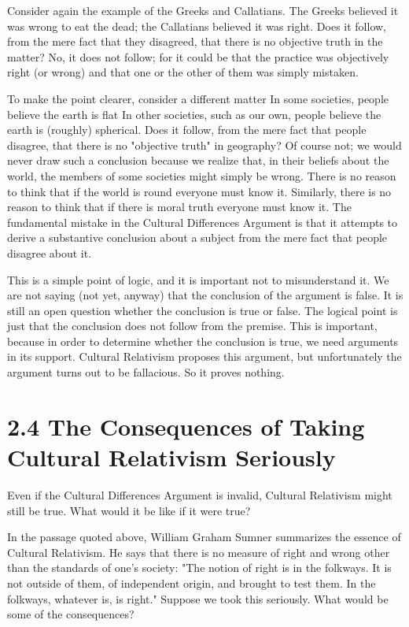 Consider  again  the  example  of  the  Greeks  and  Callatians.  The  Greeks 
believed  it  was  wrong  to  eat  the  dead;  the  Callatians  believed  it  was 
right. Does it follow, from the mere fact that they disagreed, that there is 
no objective truth in the matter? No, it does not follow; for it could be that 
the practice was objectively right (or wrong) and that one or the other of 
them was simply mistaken. 

To make the point clearer, consider a different matter In some societies, 
people  believe  the  earth  is  flat  In  other  societies,  such  as  our  own,
people believe  the  earth  is  (roughly)  spherical.  Does  it  follow,  from  the 
mere  fact  that  people  disagree,  that  there  is  no  "objective  truth"  in 
geography?  Of  course  not;  we  would  never  draw  such  a  conclusion 
because we realize that, in their beliefs about the world, the members of 
some societies might simply be wrong. There is no reason to think that if 
the world is round everyone must know it. Similarly, there is no reason to 
think that if there is moral truth everyone must know it. The fundamental 
mistake in the Cultural Differences Argument is that it attempts to derive 
a substantive conclusion about a subject from the mere fact that people 
disagree about it. 

This is a simple point of logic, and it is important not to misunderstand it. 
We are not saying (not yet, anyway) that the conclusion of the argument 
is false. It is still an open question whether the conclusion is true or false. 
The  logical  point  is  just  that  the  conclusion  does  not  follow  from  the 
premise.  This  is  important,  because  in  order  to  determine  whether  the 
conclusion is true, we need arguments in its support. Cultural Relativism 
proposes  this  argument,  but  unfortunately  the  argument  turns  out to  be 
fallacious. So it proves nothing.  

\section{2.4 The Consequences of Taking Cultural Relativism Seriously} 
Even  if  the  Cultural  Differences  Argument  is  invalid,  Cultural  Relativism 
might still be true. What would it be like if it were true? 

In the passage quoted above, William Graham Sumner summarizes the 
essence of Cultural Relativism. He says that there is no measure of right 
and wrong other than the standards of one's society: "The notion of right 
is  in  the  folkways.  It  is  not  outside  of  them,  of  independent  origin,  and 
brought to test them. In the folkways, whatever is, is right." Suppose we 
took this seriously. What would be some of the consequences? 
